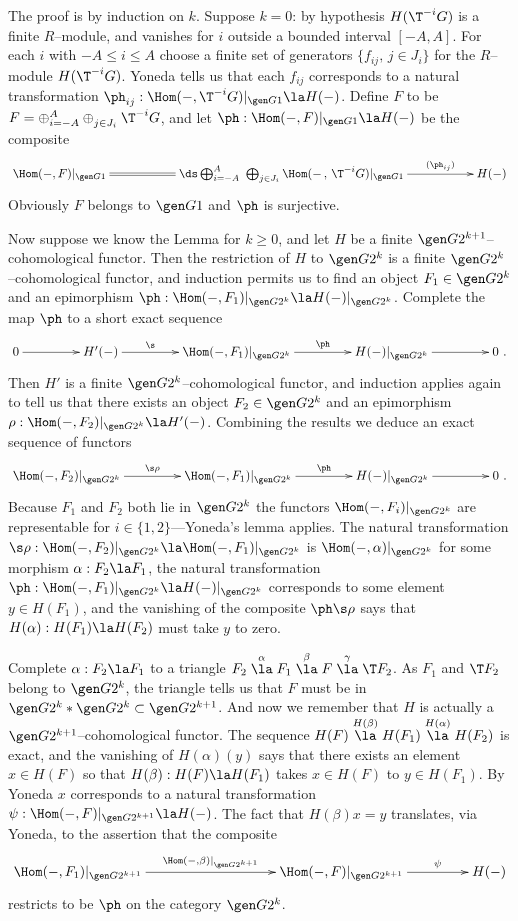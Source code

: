 \documentclass[11pt]{amsart}
\begin{document}
\prf
The proof is by induction on $k$. Suppose $k=0$:
by hypothesis $H(\T^{-i}G)$ is a finite $R$--module, and vanishes for $i$
outside a
bounded interval $[-A,A]$. For each $i$ with $-A\leq i\leq A$ choose
a finite set of generators $\{f_{ij},\,j\in J_i\}$ for
the $R$--module $H(\T^{-i}G)$. Yoneda tells us that
each $f_{ij}$ corresponds to a natural transformation
$\ph_{ij}:\Hom(-,\T^{-i}G)|_{\gen G1}\la H(-)$. Define
$F$ to be $F=\oplus_{i=-A}^A\oplus_{j\in J_i}^{}\T^{-i}G$,
and let $\ph:\Hom(-,F)|_{\gen G1}\la H(-)$ be the
composite
\[\xymatrix@C+30pt{
  \Hom(-,F)|_{\gen G1}\ar@{=}[r] &
  \ds\bigoplus_{i=-A}^A\,\,\bigoplus_{j\in J_i}\Hom(-\,,\,\T^{-i}G)|_{\gen G1}
  \ar[r]^-{(\ph_{ij})} & H(-)
}\]
Obviously $F$ belongs to $\gen G1$ and $\ph$ is surjective.

Now suppose we know the Lemma for $k\geq0$, and let $H$ be a
finite $\gen G{2^{k+1}}$--cohomological functor. Then
the restriction of $H$ to  $\gen G{2^k}$ is a finite
$\gen G{2^k}$--cohomological functor, and induction
permits us to find an object $F_1\in\gen G{2^k}$
and an epimorphism $\ph:\Hom(-,F_1)|_{\gen G{2^k}}\la H(-)|_{\gen G{2^k}}$.
Complete the map $\ph$ to a short exact sequence
\[\xymatrix@C+20pt{
  0\ar[r] & H'(-)\ar[r]^-{\s} &\Hom(-,F_1)|_{\gen G{2^k}} \ar[r]^-{\ph} &
  H(-)|_{\gen G{2^k}}\ar[r] & 0\ .
}\]
Then $H'$ is a finite $\gen G{2^k}$--cohomological functor, and induction
applies again to tell us that there exists an object $F_2\in\gen G{2^k}$
and an epimorphism $\rho:\Hom(-,F_2)|_{\gen G{2^k}}\la H'(-)$.
Combining the results we deduce an 
exact sequence of functors
\[\xymatrix@C+20pt{
  \Hom(-,F_2)|_{\gen G{2^k}}  \ar[r]^-{\s\rho} &
  \Hom(-,F_1)|_{\gen G{2^k}} \ar[r]^-{\ph} &
  H(-)|_{\gen G{2^k}}\ar[r] & 0\ .
}\]
Because $F_1$ and $F_2$ both lie in $\gen G{2^k}$
the functors $\Hom(-,F_i)|_{\gen G{2^k}}$ are
representable for $i\in\{1,2\}$---Yoneda's lemma applies.
The natural transformation
$\s\rho:\Hom(-,F_2)|_{\gen G{2^k}}\la \Hom(-,F_1)|_{\gen G{2^k}}$
is $\Hom(-,\alpha)|_{\gen G{2^k}}$ for some morphism $\alpha:F_2\la F_1$,
the natural transformation $\ph:\Hom(-,F_1)|_{\gen G{2^k}}\la H(-)|_{\gen G{2^k}}$
corresponds to some element $y\in H(F_1)$, and the vanishing
of the composite $\ph\s\rho$ says that $H(\alpha):H(F_1)\la H(F_2)$
must take $y$ to zero. 

Complete $\alpha: F_2\la F_1$ to a triangle
$F_2\stackrel\alpha\la F_1\stackrel\beta\la F\stackrel\gamma\la \T F_2$.
As $F_1$ and $\T F_2$ belong to $\gen G{2^k}$, the triangle
tells us that $F$ must be in $\gen G{2^k}*\gen G{2^k}\subset\gen G{2^{k+1}}$.
And now we remember that $H$ is actually a $\gen G{2^{k+1}}$--cohomological
functor. The sequence
$H(F)\stackrel{H(\beta)}\la H(F_1)\stackrel{H(\alpha)}\la H(F_2)$ is
exact, and the vanishing of $H(\alpha)(y)$ says that there exists an
element $x\in H(F)$ so that $H(\beta):H(F)\la H(F_1)$ takes
$x\in H(F)$ to $y\in H(F_1)$. By Yoneda $x$ corresponds to a natural
transformation $\psi:\Hom(-,F)|_{\gen G{2^{k+1}}}\la H(-)$.
The fact that $H(\beta)x=y$ translates, via Yoneda,
to the assertion that the composite
\[\xymatrix@C+20pt{
  \Hom(-,F_1)|_{\gen G{2^{k+1}}}  \ar[rr]^-{\Hom(-,\beta)|_{\gen G{2^{k+1}}}} &&
  \Hom(-,F)|_{\gen G{2^{k+1}}} \ar[r]^-{\psi} &
  H(-)
}\]
restricts to be $\ph$ on the category $\gen G{2^k}$.
\end{document}
